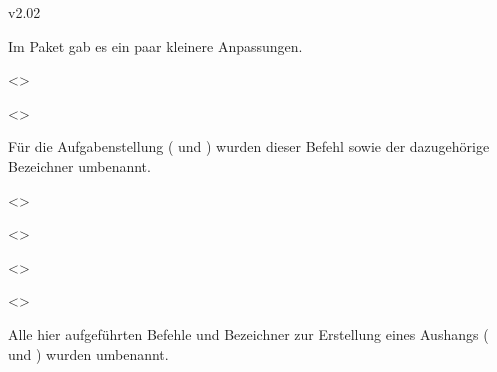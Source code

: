 \begin{Cessations}{v2.02}

\begin{Entity}{}
Im Paket  gab es ein paar kleinere Anpassungen.
\begin{Cessation}
  {}
  <>
\begin{Cessation}
  {}
  <>
\printdeclarationlist

Für die Aufgabenstellung ( und ) wurden 
dieser Befehl sowie der dazugehörige Bezeichner umbenannt.
\end{Cessation}
\end{Cessation}

\begin{Cessation}
  {}
  <>
\begin{Cessation}
  {}
  <>
\begin{Cessation}
  {}
  <>
\begin{Cessation}
  {}
  <>
\printdeclarationlist

Alle hier aufgeführten Befehle und Bezeichner zur Erstellung eines Aushangs 
( und ) wurden umbenannt.
\end{Cessation}
\end{Cessation}
\end{Cessation}
\end{Cessation}
\end{Entity}
\end{Cessations}



